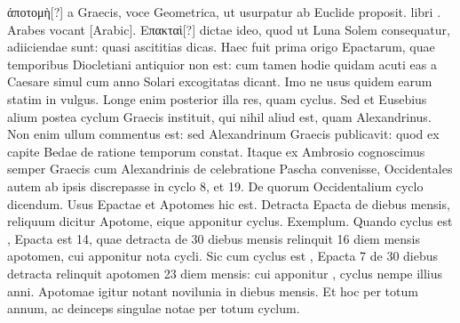  \textgreek{ἀποτομὴ[?]} a Graecis,
voce Geometrica, ut usurpatur ab Euclide proposit.
 libri
.
Arabes vocant \textarabic{[Arabic]}.
\textgreek{Επακταὶ[?]} dictae ideo, quod ut Luna Solem
consequatur, adiiciendae sunt: quasi ascititias dicas.
Haec fuit
prima origo Epactarum, quae temporibus Diocletiani antiquior
non est: cum tamen hodie quidam acuti eas a Caesare simul cum anno
Solari excogitatas dicant.
Imo ne usus quidem earum statim in vulgus.
Longe enim posterior illa res, %
 quam cyclus.
Sed et Eusebius
alium postea cyclum Graecis instituit, qui nihil aliud est, quam Alexandrinus.
%
Non enim ullum commentus est: sed Alexandrinum Graecis
publicavit: quod ex  capite Bedae de ratione temporum
constat.
Itaque ex Ambrosio cognoscimus semper Graecis cum Alexandrinis
de celebratione Pascha convenisse, Occidentales autem ab
ipsis discrepasse in cyclo 8, et 19.
De quorum Occidentalium cyclo
dicendum.
Usus Epactae et Apotomes hic est.
Detracta Epacta de
diebus mensis, reliquum dicitur Apotome, eique apponitur cyclus.
Exemplum.
Quando cyclus est , Epacta est 14, quae detracta de
30 diebus mensis relinquit 16 diem mensis apotomen, cui apponitur
 nota cycli.
Sic cum cyclus est , Epacta 7 de 30 diebus detracta
relinquit apotomen 23 diem mensis: cui apponitur , cyclus
nempe illius anni.
Apotomae igitur notant novilunia in diebus mensis.
Et hoc per totum annum, ac deinceps singulae notae per totum
cyclum.
\vspace*{\fill}
%
